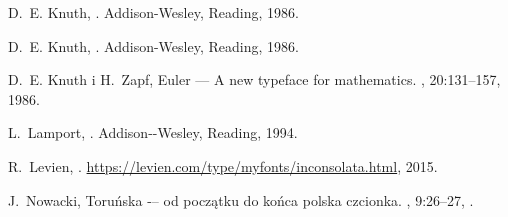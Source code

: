 \begin{minipage}{0.5\linewidth}
{\makeatother

\begin{thebibliography}{Knu86b}


D.~E. Knuth,
.
\newblock Addison-Wesley, Reading, 1986.\vspace{-3mm}

D.~E. Knuth,
.
\newblock Addison-Wesley, Reading, 1986.\vspace{-3mm}

D.~E. Knuth i H.~Zapf,
 {Euler} --- {A} new typeface for mathematics.
, {20}:131--157, 1986.\vspace{-3mm}

L.~Lamport,
.
\newblock Addison-\mbox{-Wesley}, Reading, 1994.\vspace{-3mm}

R.~Levien,
.
\newblock \url{https://levien.com/type/myfonts/inconsolata.html}, 2015.\vspace{-3mm}


J.~Nowacki,
 {Toruńska} -– od początku do końca polska czcionka.
, 9:26--27,
  .\vspace{-2mm}


\end{thebibliography}
}
\end{minipage}
